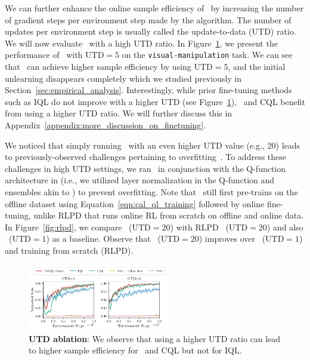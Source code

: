 We can further enhance the online sample efficiency of \methodname\ by increasing the number of gradient steps per environment step made by the algorithm. The number of updates per environment step is usually called the update-to-data (UTD) ratio. We will now evaluate \methodname\ with a high UTD ratio. In Figure~\ref{fig:utd-cog}, we present the performance of \methodname\ with $\text{UTD}=5$ on the \texttt{visual-manipulation} task. We can see that \methodname\ can achieve higher sample efficiency by using $\text{UTD}=5$, and the initial unlearning disappears completely which we studied previously in Section~\ref{sec:empirical_analysis}. Interestingly, while prior fine-tuning methods such as IQL do not improve with a higher UTD (see Figure~\ref{fig:utd-cog}), \methodname\ and CQL benefit from using a higher UTD ratio. We will further discuss this in Appendix~\ref{appendix:more_discussion_on_finetuning}.

We noticed that simply running \methodname\ with an even higher UTD value (e.g., 20) leads to previously-observed challenges pertaining to overfitting~\citep{li2023efficient, redq, rlpd, replaybarrier}. To address these challenges in high UTD settings, we ran \methodname\ in conjunction with the Q-function architecture in \cite{rlpd} (i.e., we utilized layer normalization in the Q-function and ensembles akin to \cite{redq}) to prevent overfitting. Note that \methodname\ still first pre-trains on the offline dataset using Equation~\ref{eqn:cal_ql_training} followed by online fine-tuning, unlike RLPD that runs online RL from scratch on offline and online data. 
In Figure~\ref{fig:rlpd}, we compare \methodname\ ($\text{UTD}=20$) with RLPD~\cite{rlpd} ($\text{UTD}=20$) and also \methodname\ ($\text{UTD}=1$) as a baseline. Observe that \methodname\ ($\text{UTD}=20$) improves over \methodname\ ($\text{UTD}=1$) and training from scratch (RLPD).   

\begin{figure}[ht]
\vspace{-0.3cm}
\begin{center}
\centerline{\includegraphics[width=0.55\textwidth]{chapters/cal_ql/figs-sample/cog-highutd-final.pdf}}
\vspace{-0.3cm}
\caption{\label{fig:utd-cog}\footnotesize{\textbf{UTD ablation}: We observe that using a higher UTD ratio can lead to higher sample efficiency for \methodname\ and CQL but not for IQL.}}
\end{center}
\vspace{-0.9cm}
\end{figure}

